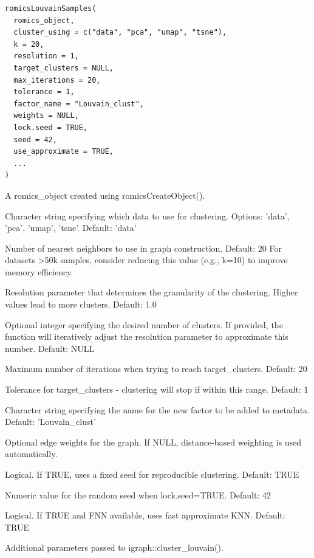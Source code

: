 \documentclass[a4paper]{book}
\begin{document}
%
\begin{Usage}
\begin{verbatim}
romicsLouvainSamples(
  romics_object,
  cluster_using = c("data", "pca", "umap", "tsne"),
  k = 20,
  resolution = 1,
  target_clusters = NULL,
  max_iterations = 20,
  tolerance = 1,
  factor_name = "Louvain_clust",
  weights = NULL,
  lock.seed = TRUE,
  seed = 42,
  use_approximate = TRUE,
  ...
)
\end{verbatim}
\end{Usage}
%
\begin{Arguments}
\begin{ldescription}
\item[\code{romics\_object}] A romics\_object created using romicsCreateObject().

\item[\code{cluster\_using}] Character string specifying which data to use for clustering. Options: 'data', 'pca', 'umap', 'tsne'.
Default: 'data'

\item[\code{k}] Number of nearest neighbors to use in graph construction. Default: 20
For datasets >50k samples, consider reducing this value (e.g., k=10) to improve memory efficiency.

\item[\code{resolution}] Resolution parameter that determines the granularity of the clustering.
Higher values lead to more clusters. Default: 1.0

\item[\code{target\_clusters}] Optional integer specifying the desired number of clusters. If provided, the function will
iteratively adjust the resolution parameter to approximate this number. Default: NULL

\item[\code{max\_iterations}] Maximum number of iterations when trying to reach target\_clusters. Default: 20

\item[\code{tolerance}] Tolerance for target\_clusters - clustering will stop if within this range. Default: 1

\item[\code{factor\_name}] Character string specifying the name for the new factor to be added to metadata.
Default: 'Louvain\_clust'

\item[\code{weights}] Optional edge weights for the graph. If NULL, distance-based weighting is used automatically.

\item[\code{lock.seed}] Logical. If TRUE, uses a fixed seed for reproducible clustering. Default: TRUE

\item[\code{seed}] Numeric value for the random seed when lock.seed=TRUE. Default: 42

\item[\code{use\_approximate}] Logical. If TRUE and FNN available, uses fast approximate KNN. Default: TRUE

\item[\code{...}] Additional parameters passed to igraph::cluster\_louvain().
\end{ldescription}
\end{Arguments}
\end{document}
